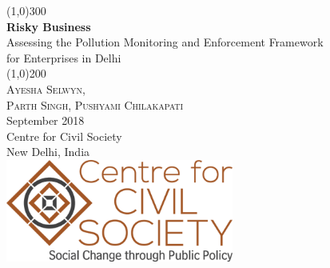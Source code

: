 \documentclass[a4paper, 12pt]{article}
\begin{document}
                    
                    \begin{titlepage}
                    	\begin{center}
                    	\line(1,0){300}\\
                    	[0.25in]
                    	\huge{\bfseries \textcolor{CCSbrown} {Risky Business}} \\
    	[0.5cm]
    	\large  {Assessing the Pollution Monitoring and Enforcement Framework\\  for Enterprises in Delhi} \\
    	
                    	\line(1,0){200}\\
                    	[1in]
                    	\textsc{\huge Ayesha Selwyn, \\ Parth Singh, Pushyami Chilakapati} \\
                    	[1.5cm]
                    	{\Large September 2018} \\
                    	[2.0cm]
                    	{\LARGE Centre for Civil Society} \\
                    	[0.1mm]
                    	{\Large New Delhi, India} \\
    	[2.0cm]
    	\includegraphics[width = 75mm]{unnamed.png}
      
                    	\end{center}
                    \end{titlepage}
                    \tableofcontents
                    
                   \newpage
         
\end{document}
